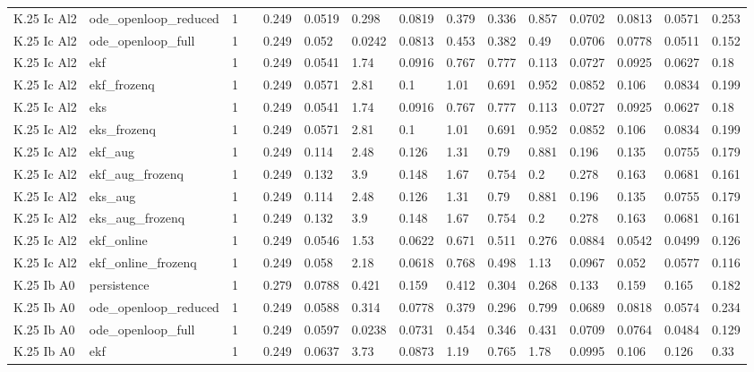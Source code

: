 \begin{table}[t]
\begin{tabular}{lllllllllllllll}
K.25 Ic Al2 & ode\_openloop\_reduced & 1 &  & 0.249 & 0.0519 & 0.298 & 0.0819 & 0.379 & 0.336 & 0.857 & 0.0702 & 0.0813 & 0.0571 & 0.253 \\
K.25 Ic Al2 & ode\_openloop\_full & 1 &  & 0.249 & 0.052 & 0.0242 & 0.0813 & 0.453 & 0.382 & 0.49 & 0.0706 & 0.0778 & 0.0511 & 0.152 \\
K.25 Ic Al2 & ekf & 1 &  & 0.249 & 0.0541 & 1.74 & 0.0916 & 0.767 & 0.777 & 0.113 & 0.0727 & 0.0925 & 0.0627 & 0.18 \\
K.25 Ic Al2 & ekf\_frozenq & 1 &  & 0.249 & 0.0571 & 2.81 & 0.1 & 1.01 & 0.691 & 0.952 & 0.0852 & 0.106 & 0.0834 & 0.199 \\
K.25 Ic Al2 & eks & 1 &  & 0.249 & 0.0541 & 1.74 & 0.0916 & 0.767 & 0.777 & 0.113 & 0.0727 & 0.0925 & 0.0627 & 0.18 \\
K.25 Ic Al2 & eks\_frozenq & 1 &  & 0.249 & 0.0571 & 2.81 & 0.1 & 1.01 & 0.691 & 0.952 & 0.0852 & 0.106 & 0.0834 & 0.199 \\
K.25 Ic Al2 & ekf\_aug & 1 &  & 0.249 & 0.114 & 2.48 & 0.126 & 1.31 & 0.79 & 0.881 & 0.196 & 0.135 & 0.0755 & 0.179 \\
K.25 Ic Al2 & ekf\_aug\_frozenq & 1 &  & 0.249 & 0.132 & 3.9 & 0.148 & 1.67 & 0.754 & 0.2 & 0.278 & 0.163 & 0.0681 & 0.161 \\
K.25 Ic Al2 & eks\_aug & 1 &  & 0.249 & 0.114 & 2.48 & 0.126 & 1.31 & 0.79 & 0.881 & 0.196 & 0.135 & 0.0755 & 0.179 \\
K.25 Ic Al2 & eks\_aug\_frozenq & 1 &  & 0.249 & 0.132 & 3.9 & 0.148 & 1.67 & 0.754 & 0.2 & 0.278 & 0.163 & 0.0681 & 0.161 \\
K.25 Ic Al2 & ekf\_online & 1 &  & 0.249 & 0.0546 & 1.53 & 0.0622 & 0.671 & 0.511 & 0.276 & 0.0884 & 0.0542 & 0.0499 & 0.126 \\
K.25 Ic Al2 & ekf\_online\_frozenq & 1 &  & 0.249 & 0.058 & 2.18 & 0.0618 & 0.768 & 0.498 & 1.13 & 0.0967 & 0.052 & 0.0577 & 0.116 \\
K.25 Ib A0 & persistence & 1 &  & 0.279 & 0.0788 & 0.421 & 0.159 & 0.412 & 0.304 & 0.268 & 0.133 & 0.159 & 0.165 & 0.182 \\
K.25 Ib A0 & ode\_openloop\_reduced & 1 &  & 0.249 & 0.0588 & 0.314 & 0.0778 & 0.379 & 0.296 & 0.799 & 0.0689 & 0.0818 & 0.0574 & 0.234 \\
K.25 Ib A0 & ode\_openloop\_full & 1 &  & 0.249 & 0.0597 & 0.0238 & 0.0731 & 0.454 & 0.346 & 0.431 & 0.0709 & 0.0764 & 0.0484 & 0.129 \\
K.25 Ib A0 & ekf & 1 &  & 0.249 & 0.0637 & 3.73 & 0.0873 & 1.19 & 0.765 & 1.78 & 0.0995 & 0.106 & 0.126 & 0.33 \\

\end{tabular}
\end{table}

